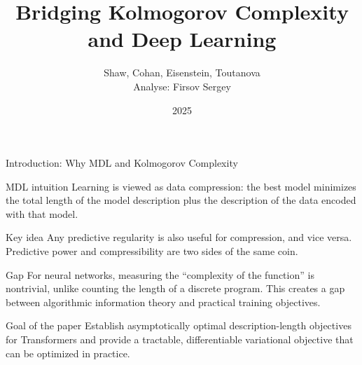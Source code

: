 \documentclass{beamer}
\title{Bridging Kolmogorov Complexity and Deep Learning}
\author{Shaw, Cohan, Eisenstein, Toutanova \\ Analyse: Firsov Sergey}
\institute{MIPT}
\date{2025}
\begin{document}
\begin{frame}[plain]
    \titlepage
\end{frame}

\begin{frame}{Introduction: Why MDL and Kolmogorov Complexity}
\small
\begin{block}{MDL intuition}
Learning is viewed as data compression: the best model minimizes the total length of the model description plus the description of the data encoded with that model.
\end{block}

\begin{block}{Key idea}
Any predictive regularity is also useful for compression, and vice versa. Predictive power and compressibility are two sides of the same coin.
\end{block}

\begin{block}{Gap}
For neural networks, measuring the “complexity of the function” is nontrivial, unlike counting the length of a discrete program. This creates a gap between algorithmic information theory and practical training objectives.
\end{block}

\begin{block}{Goal of the paper}
Establish asymptotically optimal description-length objectives for Transformers and provide a tractable, differentiable variational objective that can be optimized in practice.
\end{block}
\end{frame}
\end{document}
